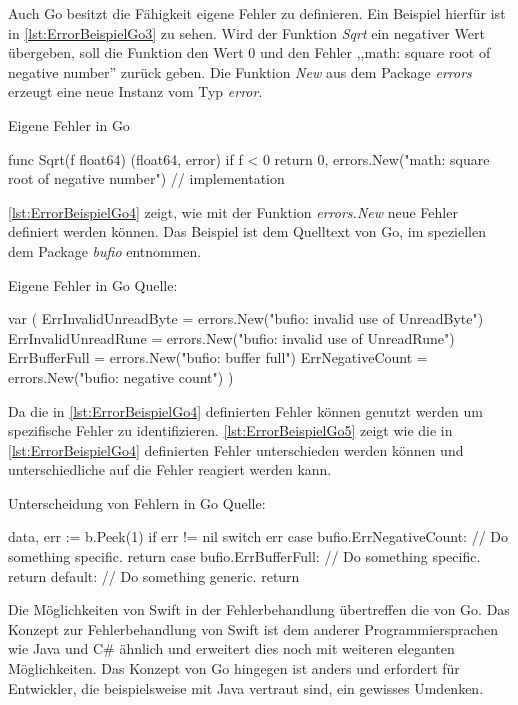 Auch Go besitzt die Fähigkeit eigene Fehler zu definieren.
Ein Beispiel hierfür ist in \autoref{lst:ErrorBeispielGo3} zu sehen.
Wird der Funktion \textit{Sqrt} ein negativer Wert übergeben, soll die Funktion den Wert 0 und den Fehler ,,math: square root of negative number'' zurück geben. 
Die Funktion \textit{New} aus dem Package \textit{errors} erzeugt eine neue Instanz vom Typ \textit{error}.

\begin{listing}[H]
\caption{Eigene Fehler in Go \cite[]{GoBlog.ErroHandling}}
\label{lst:ErrorBeispielGo3}
\begin{GoCode}
func Sqrt(f float64) (float64, error) {
    if f < 0 {
        return 0, errors.New("math: square root of negative number")
    }
    // implementation
}
\end{GoCode}
\end{listing}

\autoref{lst:ErrorBeispielGo4} zeigt, wie mit der Funktion \textit{errors.New} neue Fehler definiert werden können. 
Das Beispiel ist dem Quelltext von Go, im speziellen dem Package \textit{bufio} entnommen.

\begin{listing}[H]
\caption{Eigene Fehler in Go Quelle: \cite[]{GolangBufio}}
\label{lst:ErrorBeispielGo4}
\begin{GoCode}
var (
    ErrInvalidUnreadByte = errors.New("bufio: invalid use of UnreadByte")
    ErrInvalidUnreadRune = errors.New("bufio: invalid use of UnreadRune")
    ErrBufferFull        = errors.New("bufio: buffer full")
    ErrNegativeCount     = errors.New("bufio: negative count")
)
\end{GoCode}
\end{listing}

Da die in \autoref{lst:ErrorBeispielGo4} definierten Fehler können genutzt werden um spezifische Fehler zu identifizieren. 
\autoref{lst:ErrorBeispielGo5} zeigt wie die in \autoref{lst:ErrorBeispielGo4} definierten Fehler unterschieden werden können und unterschiedliche auf die Fehler reagiert werden kann.

\begin{listing}[H]
\caption{Unterscheidung von Fehlern in Go Quelle: \cite[]{GoingGo.Error1}}
\label{lst:ErrorBeispielGo5}
\begin{GoCode}
data, err := b.Peek(1)
if err != nil {
    switch err {
        case bufio.ErrNegativeCount:
            // Do something specific.
            return
        case bufio.ErrBufferFull:
            // Do something specific.
            return
        default:
            // Do something generic.
            return
    }
}
\end{GoCode}
\end{listing}



Die Möglichkeiten von Swift in der Fehlerbehandlung übertreffen die von Go.
Das Konzept zur Fehlerbehandlung von Swift ist dem anderer Programmiersprachen wie Java und C\# ähnlich und erweitert dies noch mit weiteren eleganten Möglichkeiten.
Das Konzept von Go hingegen ist anders und erfordert für Entwickler, die beispielsweise mit Java vertraut sind, ein gewisses Umdenken. 
